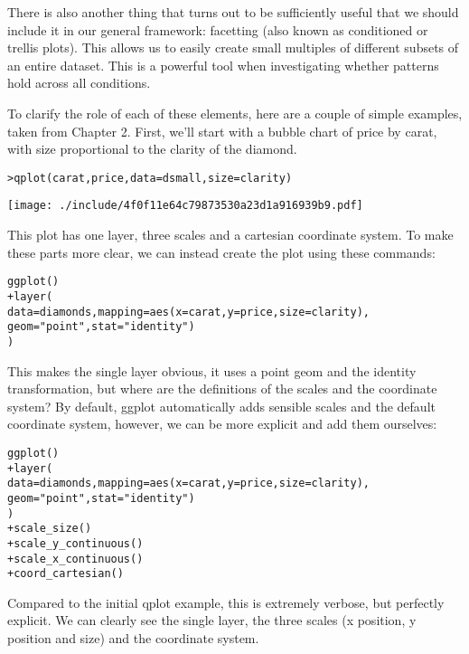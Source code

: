There is also another thing that turns out to be sufficiently useful that we should include it in our general framework: facetting (also known as conditioned or trellis plots). This allows us to easily create small multiples of different subsets of an entire dataset. This is a powerful tool when investigating whether patterns hold across all conditions.

To clarify the role of each of these elements, here are a couple of simple examples, taken from Chapter 2.  First, we'll start with a bubble chart of price by carat, with size proportional to the clarity of the diamond.

\begin{alltt}
> qplot(carat, price, data = dsmall, size = clarity)
\end{alltt}
\texttt{[image: ./include/4f0f11e64c79873530a23d1a916939b9.pdf]}
\begin{alltt}

\end{alltt}

This plot has one layer, three scales and a cartesian coordinate system.  To make these parts more clear, we can instead create the plot using these commands:

\begin{alltt}
ggplot()
+ layer(
    data = diamonds, mapping = aes(x = carat, y = price, size = clarity),
    geom = "point", stat = "identity")
  )
\end{alltt}

This makes the single layer obvious, it uses a point geom and the identity transformation, but where are the definitions of the scales and the coordinate system?  By default, ggplot automatically adds sensible scales and the default coordinate system, however, we can be more explicit and add them ourselves:

\begin{alltt}
ggplot() 
+ layer(
    data = diamonds, mapping = aes(x = carat, y = price, size = clarity),
    geom = "point", stat = "identity")
  )
+ scale_size()
+ scale_y_continuous()
+ scale_x_continuous()
+ coord_cartesian()
\end{alltt}

Compared to the initial qplot example, this is extremely verbose, but perfectly explicit.  We  can clearly see the single layer, the three scales (x position, y position and size) and the coordinate system.  

